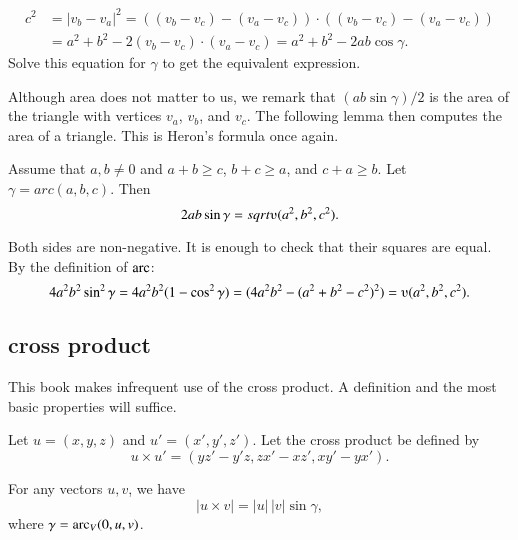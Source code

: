 \begin{proved}
    $$\begin{array}{lll}c^2 &= |v_b - v_a|^2 = ((v_b - v_c) - (v_a - v_c))\cdot ((v_b - v_c) - (v_a -
    v_c)) \\ &= a^2 + b^2 - 2 (v_b - v_c)\cdot (v_a - v_c) = a^2 +b ^2 - 2 a b
    \cos\gamma.
    \end{array}$$
    Solve this equation for $\gamma$ to get the equivalent expression. 
\swallowed\end{proved}

Although area does not matter to us, we remark
that $(a b \sin\gamma)/2$ is the area of the
triangle with vertices $v_a$, $v_b$, and $v_c$.  The following
lemma then
computes the area of a triangle.  This is Heron's formula
once again.

\begin{lemma}
Assume that $a,b\ne 0$ and $a+b\ge c$, $b+c\ge a$, and $c+a\ge b$.
Let $\gamma=arc(a,b,c)$.  Then
        $$2 a b \sin\gamma = \sqrt{\ups(a^2,b^2,c^2)}.$$
\end{lemma}

\begin{proved}
Both sides are non-negative.  It is enough to check
that their squares are equal.  By the definition of $\operatorname{arc}$:
      $$4 a^2 b^2 \sin^2\gamma = 4 a^2 b^2 (1-\cos^2\gamma) = (4 a^2 b^2 - (a^2 + b^2 -
      c^2)^2) = \ups(a^2,b^2,c^2).$$
\swallowed\end{proved}




\subsection{cross product}%

This book makes infrequent use of the cross product.
A definition and the most basic properties will suffice.

\begin{definition}   Let $u =(x,y,z)$ and $u' = (x',y',z')$.  
Let the cross product be defined
by
    $$
    u \times u' = (y z' - y' z, z x' - x z', x y' - y x').
    $$
\end{definition}

\begin{lemma}  
For any vectors $u,v$, we have 
    $$|u \times v| = |u|\,|v|\sin\gamma,$$
where $\gamma=\operatorname{arc}_V(0,u,v)$.
\end{lemma}

